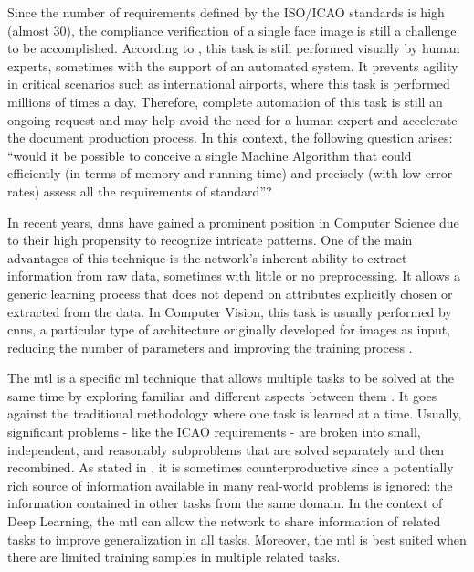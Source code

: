 Since the number of requirements defined by the ISO/ICAO standards is high (almost 30), the compliance verification of a single face image is still a challenge to be accomplished. According to \cite{ferrara2012multi}, this task is still performed visually by human experts, sometimes with the support of an automated system. It prevents agility in critical scenarios such as international airports, where this task is performed millions of times a day. Therefore, complete automation of this task is still an ongoing request and may help avoid the need for a human expert and accelerate the document production process. In this context, the following question arises: ``would it be possible to conceive a single Machine Algorithm that could efficiently (in terms of memory and running time) and precisely (with low error rates) assess all the requirements of \icao standard''?

In recent years, \acfp{dnn} have gained a prominent position in Computer Science due to their high propensity to recognize intricate patterns. One of the main advantages of this technique is the network's inherent ability to extract information from raw data, sometimes with little or no preprocessing. It allows a generic learning process that does not depend on attributes explicitly chosen or extracted from the data. In Computer Vision, this task is usually performed by \acfp{cnn}, a particular type of architecture originally developed for images as input, reducing the number of parameters and improving the training process \citep{goodfellow2016deep}.

The \acf{mtl} is a specific \acl{ml} technique that allows multiple tasks to be solved at the same time by exploring familiar and different aspects between them \citep{zhang2017survey}. It goes against the traditional methodology where one task is learned at a time. Usually, significant problems - like the ICAO requirements - are broken into small, independent, and reasonably subproblems that are solved separately and then recombined. As stated in \cite{Caruana1997}, it is sometimes counterproductive since a potentially rich source of information available in many real-world problems is ignored: the information contained in other tasks from the same domain. In the context of Deep Learning, the \acs{mtl} can allow the network to share information of related tasks to improve generalization in all tasks. Moreover, the \acl{mtl} is best suited when there are limited training samples in multiple related tasks.

